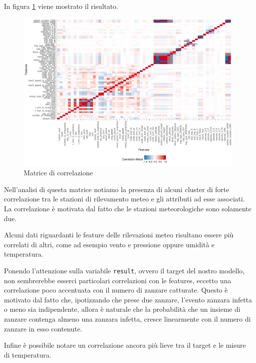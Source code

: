 In figura \ref{fig:plot_correlation} viene mostrato il risultato.

\begin{figure}[htb]
	\centering
	\includegraphics[width=1\columnwidth]{images/ml/plot_correlation}
	\caption{Matrice di correlazione}
	\label{fig:plot_correlation}
\end{figure}

Nell'analisi di questa matrice notiamo la presenza di alcuni cluster di forte 
correlazione tra le stazioni di rilevamento meteo e gli attributi ad esse 
associati. La correlazione è motivata dal fatto che le stazioni meteorologiche 
sono solamente due.

Alcuni dati riguardanti le feature delle rilevazioni meteo risultano essere più 
correlati di altri, come ad esempio vento e pressione oppure umidità e 
temperatura.

Ponendo l'attenzione sulla variabile \texttt{result}, ovvero il target del 
nostro modello, non sembrerebbe esserci particolari correlazioni con le 
features, eccetto una correlazione poco accentuata con il numero di 
zanzare catturate. Questo è motivato dal fatto che, ipotizzando che prese due 
zanzare, l'evento zanzara infetta o meno sia indipendente, allora è naturale 
che la probabilità che un insieme di zanzare contenga almeno una zanzara 
infetta, cresce linearmente con il numero di zanzare in esso contenute.

Infine è possibile notare un correlazione ancora più lieve tra il target e le 
misure di temperatura. 
